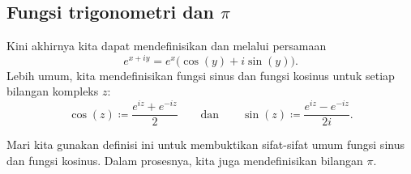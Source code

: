 \subsection{Fungsi trigonometri dan $\pi$}

Kini akhirnya kita dapat mendefinisikan \emph{} dan \emph{}
melalui persamaan
\begin{equation*}
e^{x+iy} = e^x \bigl( \cos(y) + i \sin(y) \bigr) .
\end{equation*}
Lebih umum, kita mendefinisikan fungsi sinus dan fungsi kosinus untuk setiap bilangan kompleks $z$:
\begin{equation*}
\cos(z) \coloneqq \frac{e^{iz} + e^{-iz}}{2}
\qquad\text{dan}\qquad
\sin(z) \coloneqq \frac{e^{iz} - e^{-iz}}{2i} .
\end{equation*}

Mari kita gunakan definisi ini untuk membuktikan sifat-sifat umum
fungsi sinus dan fungsi kosinus. Dalam prosesnya, kita juga mendefinisikan
bilangan $\pi$.

